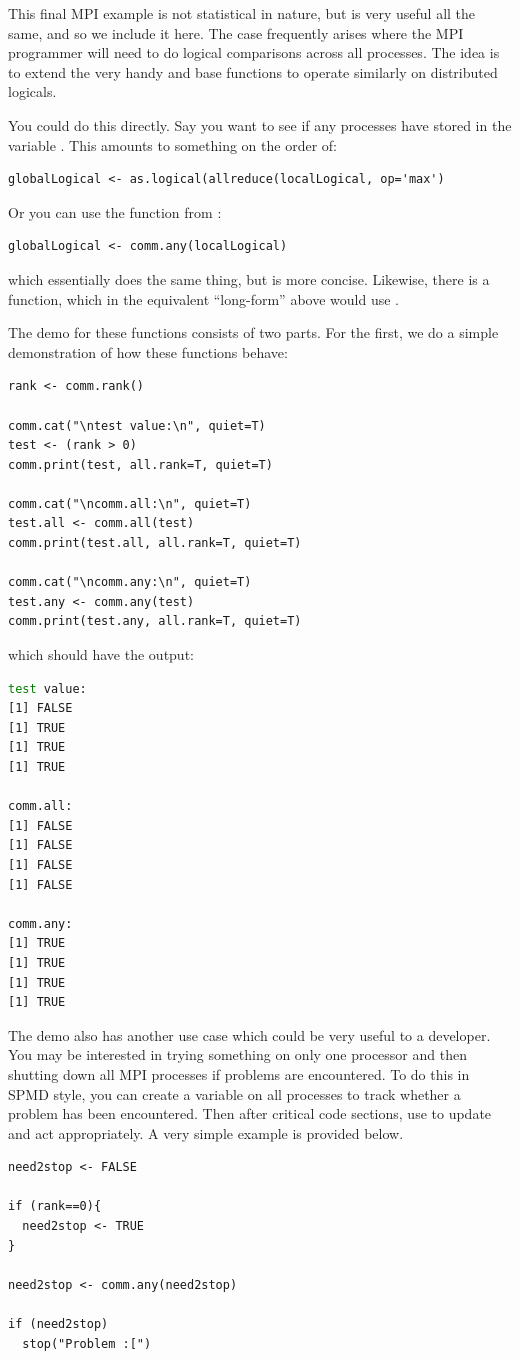 This final MPI example is not statistical in nature, but is very useful all the same, and so we include it here.  The case frequently arises where the MPI programmer will need to do logical comparisons across all processes.  The idea is to extend the very handy  and  base  functions to operate similarly on distributed logicals.

You could do this directly.  Say you want to see if any processes have  stored in the variable .  This amounts to something on the order of:
\begin{lstlisting}[language=rr,title=R Code]
globalLogical <- as.logical(allreduce(localLogical, op='max')
\end{lstlisting}
Or you can use the function  from :
\begin{lstlisting}[language=rr,title=R Code]
globalLogical <- comm.any(localLogical)
\end{lstlisting}
which essentially does the same thing, but is more concise.  Likewise, there is a  function, which in the equivalent ``long-form'' above would use .	

The demo for these functions consists of two parts.  For the first, we do a simple demonstration of how these functions behave:
\begin{lstlisting}[language=rr,title=R Code]
rank <- comm.rank()

comm.cat("\ntest value:\n", quiet=T)
test <- (rank > 0)
comm.print(test, all.rank=T, quiet=T)

comm.cat("\ncomm.all:\n", quiet=T)
test.all <- comm.all(test)
comm.print(test.all, all.rank=T, quiet=T)

comm.cat("\ncomm.any:\n", quiet=T)
test.any <- comm.any(test)
comm.print(test.any, all.rank=T, quiet=T)
\end{lstlisting}
which should have the output:
\begin{lstlisting}[language=sh]
test value:
[1] FALSE
[1] TRUE
[1] TRUE
[1] TRUE

comm.all:
[1] FALSE
[1] FALSE
[1] FALSE
[1] FALSE

comm.any:
[1] TRUE
[1] TRUE
[1] TRUE
[1] TRUE
\end{lstlisting}

The demo also has another use case which could be very useful to a developer.  You may be interested in trying something on only one processor and then shutting down all MPI processes if problems are encountered.  To do this in SPMD style, you can create a variable on all processes to track whether a problem has been encountered.  Then after critical code sections, use  to update and act appropriately.  A very simple example is provided below.

\begin{lstlisting}[language=rr,title=R Code]
need2stop <- FALSE

if (rank==0){
  need2stop <- TRUE
}

need2stop <- comm.any(need2stop)

if (need2stop)
  stop("Problem :[") 
\end{lstlisting}
